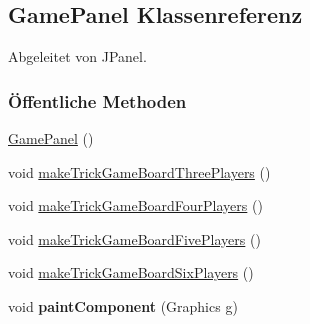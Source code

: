 \hypertarget{a00013}{\subsection{Game\-Panel Klassenreferenz}
\label{a00013}
}


Abgeleitet von J\-Panel.

\subsubsection*{Öffentliche Methoden}
\begin{DoxyCompactItemize}
\item 
\hypertarget{a00013_a73abdd374fb7a65dea21a362b9569508}{\hyperlink{a00013_a73abdd374fb7a65dea21a362b9569508}{Game\-Panel} ()}\label{a00013_a73abdd374fb7a65dea21a362b9569508}

\item 
\hypertarget{a00013_afa6a5d047dafd989e2ae07279729e2de}{void \hyperlink{a00013_afa6a5d047dafd989e2ae07279729e2de}{make\-Trick\-Game\-Board\-Three\-Players} ()}\label{a00013_afa6a5d047dafd989e2ae07279729e2de}

\item 
\hypertarget{a00013_aa9038a7308bfeec897b7948681b71df5}{void \hyperlink{a00013_aa9038a7308bfeec897b7948681b71df5}{make\-Trick\-Game\-Board\-Four\-Players} ()}\label{a00013_aa9038a7308bfeec897b7948681b71df5}

\item 
\hypertarget{a00013_ae76b0ec73b0efc3bb802b1f9fff0a695}{void \hyperlink{a00013_ae76b0ec73b0efc3bb802b1f9fff0a695}{make\-Trick\-Game\-Board\-Five\-Players} ()}\label{a00013_ae76b0ec73b0efc3bb802b1f9fff0a695}

\item 
\hypertarget{a00013_a92259214e2d47f6822290e4c70281a73}{void \hyperlink{a00013_a92259214e2d47f6822290e4c70281a73}{make\-Trick\-Game\-Board\-Six\-Players} ()}\label{a00013_a92259214e2d47f6822290e4c70281a73}

\item 
\hypertarget{a00013_aac9233d06f3c093fc37139d7d2b258f6}{void {\bfseries paint\-Component} (Graphics g)}\label{a00013_aac9233d06f3c093fc37139d7d2b258f6}

\end{DoxyCompactItemize}
